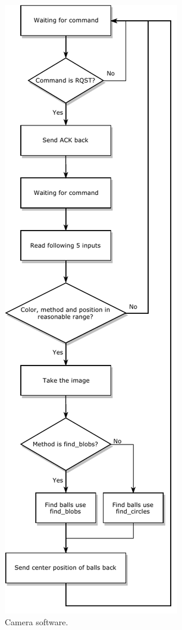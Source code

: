 \documentclass{article}
\begin{document}
\begin{figure}[H]
	\centering
	\includegraphics[keepaspectratio,height=\textheight]{camera_pseudo.pdf}
	\caption{Camera software.}
\end{figure}%
\end{document}
